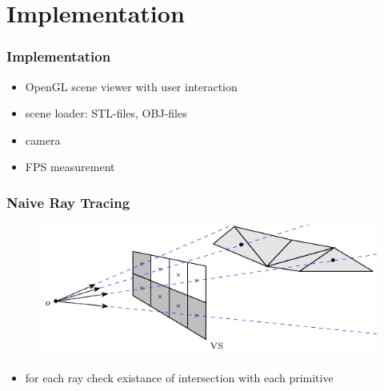 \documentclass[aspectratio=169]{beamer}
\begin{document}
  \section{Implementation} %
  \label{sec:implementation}
  \begin{frame}
    \frametitle{Implementation}
    \begin{itemize}
    \setlength\itemsep{1.1em}
      \item OpenGL scene viewer with user interaction
      \item scene loader: STL-files, OBJ-files
      \item camera
      \item FPS measurement
    \end{itemize}
  \end{frame}
  \begin{frame}
    \frametitle{Naive Ray Tracing}
    \begin{figure}[H]
      \center
      \includegraphics{ray_tracing_2.pdf}
    \end{figure}
    \begin{itemize}
      \item for each ray check existance of intersection with each primitive
    \end{itemize}
  \end{frame}
\end{document}
